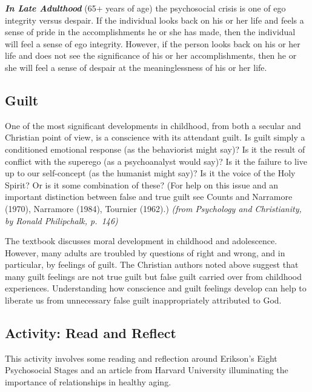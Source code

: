 \documentclass[
]{book}
\begin{document}
\textbf{\emph{In Late Adulthood}} (65+ years of age) the psychosocial crisis is one of ego integrity versus despair. If the individual looks back on his or her life and feels a sense of pride in the accomplishments he or she has made, then the individual will feel a sense of ego integrity. However, if the person looks back on his or her life and does not see the significance of his or her accomplishments, then he or she will feel a sense of despair at the meaninglessness of his or her life.

\hypertarget{guilt}{%
\subsection*{Guilt}\label{guilt}}

One of the most significant developments in childhood, from both a secular and Christian point of view, is a conscience with its attendant guilt. Is guilt simply a conditioned emotional response (as the behaviorist might say)? Is it the result of conflict with the superego (as a psychoanalyst would say)? Is it the failure to live up to our self-concept (as the humanist might say)? Is it the voice of the Holy Spirit? Or is it some combination of these? (For help on this issue and an important distinction between false and true guilt see Counts and Narramore (1970), Narramore (1984), Tournier (1962).) \emph{(from Psychology and Christianity, by Ronald Philipchalk, p.~146)}

The textbook discusses moral development in childhood and adolescence. However, many adults are troubled by questions of right and wrong, and in particular, by feelings of guilt. The Christian authors noted above suggest that many guilt feelings are not true guilt but false guilt carried over from childhood experiences. Understanding how conscience and guilt feelings develop can help to liberate us from unnecessary false guilt inappropriately attributed to God.

\hypertarget{activity-read-and-reflect-2}{%
\subsection*{Activity: Read and Reflect}\label{activity-read-and-reflect-2}}

This activity involves some reading and reflection around Erikson's Eight Psychosocial Stages and an article from Harvard University illuminating the importance of relationships in healthy aging.
\end{document}
